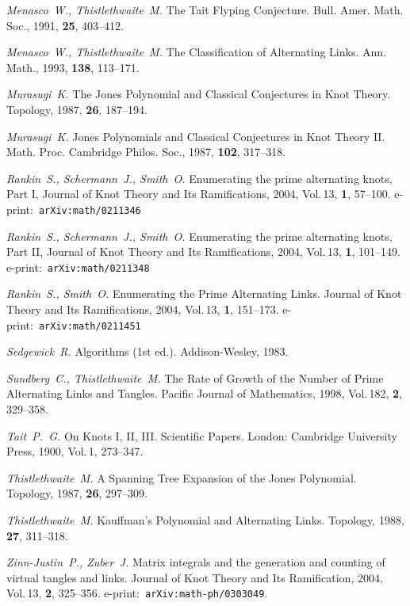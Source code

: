 \documentclass[12pt]{article}
\theoremstyle{plain}
\theoremstyle{definition}
\begin{document}
\begin{thebibliography}{88}
		{\em Menasco~W., Thistlethwaite~M.}
		The Tait Flyping Conjecture.
		Bull. Amer. Math. Soc., 1991, {\bf 25}, 403--412.

		{\em Menasco~W., Thistlethwaite~M.}
		The Classification of Alternating Links.
		Ann. Math., 1993, {\bf 138}, 113--171.

		{\em Murasugi~K.}
		The Jones Polynomial and Classical Conjectures in Knot Theory.
		Topology, 1987, {\bf 26}, 187--194.

		{\em Murasugi~K.}
		Jones Polynomials and Classical Conjectures in Knot Theory II.
		Math. Proc. Cambridge Philos. Soc., 1987, {\bf 102}, 317--318.

		{\em Rankin~S., Schermann~J., Smith~O.}
		Enumerating the prime alternating knots, Part I,
		Journal of Knot Theory and Its Ramifications, 2004, Vol.\,13, {\bf 1}, 57--100.
		e-print:~\texttt{arXiv:math/0211346}

		{\em Rankin~S., Schermann~J., Smith~O.}
		Enumerating the prime alternating knots, Part II,
		Journal of Knot Theory and Its Ramifications, 2004, Vol.\,13, {\bf 1}, 101--149.
		e-print:~\texttt{arXiv:math/0211348}

		{\em Rankin~S., Smith~O.}
		Enumerating the Prime Alternating Links.
		Journal of Knot Theory and Its Ramifications, 2004, Vol.\,13, {\bf 1}, 151--173.
		e-print:~\texttt{arXiv:math/0211451}

		{\em Sedgewick~R.}
		Algorithms (1st ed.).
		Addison-Wesley, 1983.

		{\em Sundberg~C., Thistlethwaite~M.}
		The Rate of Growth of the Number of Prime Alternating Links and Tangles.
		Pacific Journal of Mathematics, 1998, Vol.\,182, {\bf 2}, 329--358.

		{\em Tait~P.~G.}
		On Knots I, II, III.
		Scientific Papers.
		London: Cambridge University Press, 1900, Vol.\,1, 273--347.

		{\em Thistlethwaite~M.}
		A Spanning Tree Expansion of the Jones Polynomial.
		Topology, 1987, {\bf 26}, 297--309. 

		{\em Thistlethwaite~M.}
		Kauffman's Polynomial and Alternating Links.
		Topology, 1988, {\bf 27}, 311--318.

		{\em Zinn-Justin~P., Zuber~J.}
		Matrix integrals and the generation and counting of virtual tangles and links.
		Journal of Knot Theory and Its Ramification, 2004, Vol.\,13, {\bf 2}, 325--356.
		e-print:~\texttt{arXiv:math-ph/0303049}.

	\end{thebibliography}
\end{document}
